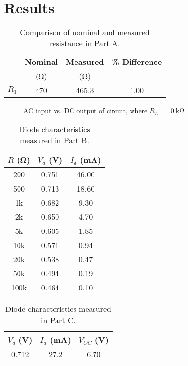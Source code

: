 \documentclass{article}
\begin{document}
\section{Results}
\label{sec:results}

\begin{table}[hbtp]
  \centering
  \begin{tabular}{*{4}{c}}
    & \textbf{Nominal} & \textbf{Measured} & \textbf{\% Difference} \\
    & (\si{\ohm}) & (\si{\ohm}) & \\
    \hline
    $R_1$ & 470 & 465.3 & 1.00 \\
  \end{tabular}
  \caption{\label{tab:percent_diff} Comparison of nominal and measured resistance in Part A.}
\end{table}

\begin{figure}[btph]
  \centering
  
  \caption{\label{fig:rect_vp_vdc} AC input vs. DC output of circuit, where $R_L=\SI{10}{\kilo\ohm}$}
\end{figure}

\begin{table}[hbtp]
  \centering
  \begin{tabular}{ccc}
    $R$ (\si{\ohm}) & $V_d$ (\si{V}) & $I_d$ (\si{mA}) \\
    \hline
    200 & 0.751 & 46.00 \\
    500 & 0.713 & 18.60 \\
    1k & 0.682 & 9.30 \\
    2k & 0.650 & 4.70 \\
    5k & 0.605 & 1.85 \\
    10k & 0.571 & 0.94 \\
    20k & 0.538 & 0.47 \\
    50k & 0.494 & 0.19 \\
    100k & 0.464 & 0.10 \\
  \end{tabular}
  \caption{\label{tab:part_b} Diode characteristics measured in Part B.}
\end{table}

\begin{table}[hbtp]
  \centering
  \begin{tabular}{ccc}
    $V_d$ (\si{V}) & $I_d$ (\si{mA}) & $V_{OC}$ (\si{V}) \\
    \hline
    0.712 & 27.2 & 6.70 \\
  \end{tabular}
  \caption{\label{tab:part_c} Diode characteristics measured in Part C.}
\end{table}
\end{document}
